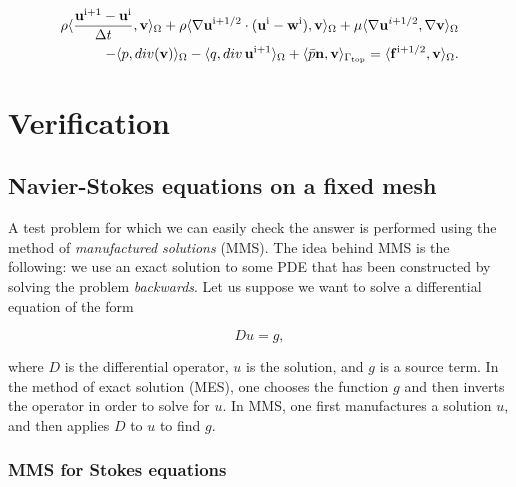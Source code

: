 \documentclass[a4paper,11pt,openright,twoside]{book}
\begin{document}
\begin{equation}
\begin{split}
\rho \langle \frac{\mathbf{u}^{\rm i+1} - \mathbf{u}^{\rm i}}{\Delta t}, \mathbf{v} \rangle_\Omega
+ \rho \langle \nabla \mathbf{u}^{\rm i+1/2} \cdot (\mathbf{u}^{\rm i} - \mathbf{w}^{\rm i}), \mathbf{v} \rangle_\Omega
+ \mu \langle \nabla \mathbf{u}^{i+1/2} , \nabla \mathbf{v} \rangle_\Omega \\
- \langle p , div(\mathbf{v}) \rangle_\Omega
- \langle q , div \, \mathbf{u}^{\rm i+1} \rangle_\Omega 
+ \langle \bar{p} \mathbf{n}, \mathbf{v} \rangle_{\Gamma_{\rm top}}
= \langle \mathbf{f}^{\rm i + 1/2}, \mathbf{v} \rangle_\Omega.
\end{split}
\end{equation}


\chapter{Verification}

\section{Navier-Stokes equations on a fixed mesh}



A test problem for which we can easily check the answer is performed using the method of \textit{manufactured solutions} (MMS). The idea behind MMS is the following: we use an exact solution to some PDE that has been constructed by solving the problem \textit{backwards}. Let us suppose we want to solve a differential equation of the form

\[
Du = g,
\]

where $D$ is the differential operator, $u$ is the solution, and $g$ is a source term. In the method of exact solution (MES), one chooses the function $g$ and then inverts the operator in order to solve for $u$. In MMS, one first manufactures a solution $u$, and then applies $D$ to $u$ to find $g$. \\




\subsection{MMS for Stokes equations}
\end{document}
